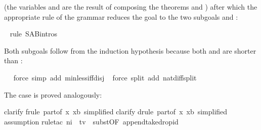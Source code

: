 \begin{isabellebody}
\begin{isamarkuptxt}%
\noindent
(the variables  and  are the result of composing the
theorems  and )
after which the appropriate rule of the grammar reduces the goal
to the two subgoals  and :%
\end{isamarkuptxt}%
\isamarkuptrue%
\ \isamarkupfalse%
{\isacharparenleft}rule\ S{\isacharunderscore}A{\isacharunderscore}B{\isachardot}intros{\isacharparenright}%
\begin{isamarkuptxt}%
Both subgoals follow from the induction hypothesis because both  and  are shorter than :%
\end{isamarkuptxt}%
\isamarkuptrue%
\ \ \isamarkupfalse%
{\isacharparenleft}force\ simp\ add{\isacharcolon}\ min{\isacharunderscore}less{\isacharunderscore}iff{\isacharunderscore}disj{\isacharparenright}\isanewline
\ \isamarkupfalse%
{\isacharparenleft}force\ split\ add{\isacharcolon}\ nat{\isacharunderscore}diff{\isacharunderscore}split{\isacharparenright}%
\begin{isamarkuptxt}%
The case  is proved analogously:%
\end{isamarkuptxt}%
\isamarkuptrue%
\isamarkupfalse%
{\isacharparenleft}clarify{\isacharparenright}\isanewline
{}\isamarkupfalse%
{\isacharparenleft}frule\ part{}{\isacharbrackleft}of\ {\isachardoublequoteopen}{\isasymlambda}x{\isachardot}\ x{\isacharequal}b{\isachardoublequoteclose}{\isacharcomma}\ simplified{\isacharbrackright}{\isacharparenright}\isanewline
{}\isamarkupfalse%
{\isacharparenleft}clarify{\isacharparenright}\isanewline
{}\isamarkupfalse%
{\isacharparenleft}drule\ part{}{\isacharbrackleft}of\ {\isachardoublequoteopen}{\isasymlambda}x{\isachardot}\ x{\isacharequal}b{\isachardoublequoteclose}{\isacharcomma}\ simplified{\isacharbrackright}{\isacharparenright}\isanewline
\ \isamarkupfalse%
{\isacharparenleft}assumption{\isacharparenright}\isanewline
{}\isamarkupfalse%
{\isacharparenleft}rule{\isacharunderscore}tac\ n{}{\isacharequal}i\ \ t{\isacharequal}v\ \ subst{\isacharbrackleft}OF\ append{\isacharunderscore}take{\isacharunderscore}drop{\isacharunderscore}id{\isacharbrackright}{\isacharparenright}\isanewline

\end{isabellebody}
